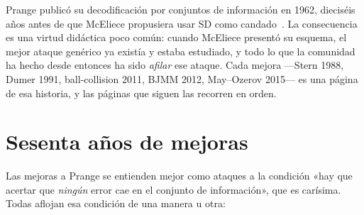 \begin{historia}
Prange publicó su decodificación por conjuntos de información en
1962, dieciséis años antes de que McEliece propusiera usar SD como
candado~\cite{prange1962,mceliece1978}. La consecuencia es una virtud
didáctica poco común: cuando McEliece presentó su esquema, el mejor
ataque genérico ya existía y estaba estudiado, y todo lo que la
comunidad ha hecho desde entonces ha sido \emph{afilar} ese ataque.
Cada mejora ---Stern 1988, Dumer 1991, ball-collision 2011,
BJMM 2012, May--Ozerov 2015--- es una página de esa historia, y las
páginas que siguen las recorren en orden.
\end{historia}

\section{Sesenta años de mejoras}

Las mejoras a Prange se entienden mejor como ataques a la condición
«hay que acertar que \emph{ningún} error cae en el conjunto de
información», que es carísima. Todas aflojan esa condición de una
manera u otra:

